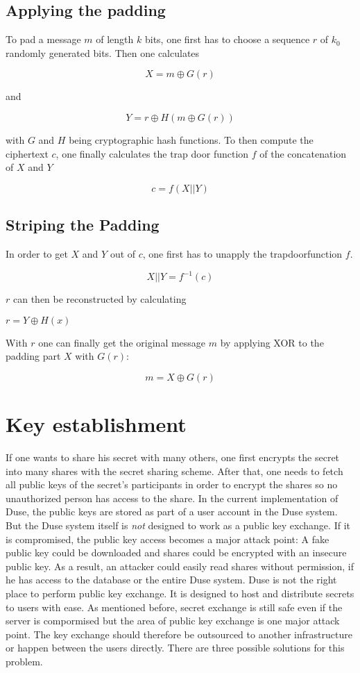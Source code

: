 \subsection{Applying the padding}

To pad a message $m$ of length $k$ bits, one first has to choose a sequence
$r$ of $k_0$ randomly generated bits. Then one calculates

$$X = m \oplus G(r)$$

and

$$Y = r \oplus H(m \oplus G(r))$$

with $G$ and $H$ being cryptographic hash functions. To then compute the
ciphertext $c$, one finally calculates the trap door function $f$ of the
concatenation of $X$ and $Y$

$$c = f(X || Y)$$

\subsection{Striping the Padding}

In order to get $X$ and $Y$ out of $c$, one first has to unapply the
trapdoorfunction $f$.

$$X || Y = f^{-1}(c)$$

$r$ can then be reconstructed by calculating

$r = Y \oplus H(x)$

With $r$ one can finally get the original message $m$ by applying XOR
to the padding part $X$ with $G(r)$:

$$m = X \oplus G(r)$$

\section{Key establishment}
\label{sec:key_establishment}

If one wants to share his secret with many others, one first encrypts the
secret into many shares with the secret sharing scheme. After that, one needs
to fetch all public keys of the secret's participants in order to encrypt the
shares so no unauthorized person has access to the share. In the current
implementation of Duse, the public keys are stored as part of a user account
in the Duse system. But the Duse system itself is \textit{not} designed to
work as a public key exchange. If it is compromised, the public key access
becomes a major attack point: A fake public key could be downloaded and shares
could be encrypted with an insecure public key. As a result, an attacker
could easily read shares without permission, if he has access to the database
or the entire Duse system. Duse is not the right place to perform public
key exchange. It is designed to host and distribute secrets to users with ease.
As mentioned before, secret exchange is still safe even if the server is compormised
but the area of public key exchange is one major attack point.
The key exchange should therefore be outsourced to another
infrastructure or happen between the users directly. There are three possible
solutions for this problem.

